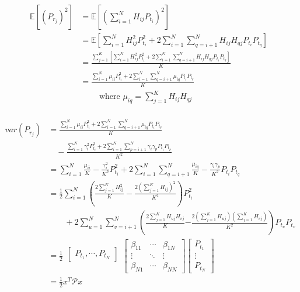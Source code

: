 \documentclass{beamer}
\providecommand{\sbrak}[1]{\ensuremath{{}\left[#1\right]}}
\providecommand{\brak}[1]{\ensuremath{\left(#1\right)}}
\providecommand{\lbrak}[1]{\ensuremath{\left(#1\right.}}
\providecommand{\rbrak}[1]{\ensuremath{\left.#1\right)}}
\theoremstyle{remark}
\begin{document}
\begin{frame}
\footnotesize{
\begin{align}
\mathbb{E}\sbrak{\brak{P_{r_j}}^2}&=\mathbb{E}\sbrak{\brak{\sum_{i=1}^NH_{ij}P_{t_i}}^2}\\ \nonumber
&=\mathbb{E}\sbrak{\sum_{i=1}^N H_{ij}^2P_{t_i}^2 + 2 \sum_{i=1}^N \sum_{q=i+1}^{N} H_{ij}H_{qj}P_{t_i}P_{t_q}}\\ \nonumber
&=\frac{\sum_{j=1}^K\sbrak{\sum_{i=1}^N H_{ij}^2P_{t_i}^2 + 2 \sum_{i=1}^N \sum_{q=i+1}^{N} H_{ij}H_{qj}P_{t_i}P_{t_q}}}{K}\\ \nonumber
&=\frac{\sum_{i=1}^N \mu_{ii} P_{t_i}^2 + 2 \sum_{i=1}^N \sum_{q=i+1}^{N} \mu_{iq} P_{t_i}P_{t_q}}{K}\\
&\qquad \text{ where } \mu_{iq}=\sum_{j=1}^KH_{ij}H_{qj}\\ \nonumber
\end{align}
}
\end{frame}
\begin{frame}
\footnotesize{
\begin{align}
var(P_{r_j})&=\frac{\sum_{i=1}^N \mu_{ii} P_{t_i}^2 + 2 \sum_{i=1}^N \sum_{q=i+1}^{N} \mu_{iq} P_{t_i}P_{t_q}}{K} \nonumber \\
             & \quad- \frac{\sum_{i=1}^N\gamma_i^2P_{t_i}^2+2\sum_{i=1}^N\sum_{p=i+1}^{N}\gamma_i\gamma_pP_{t_i}P_{t_p}}{K^2}  \nonumber \\
            &=\sum_{i=1}^N \frac{\mu_{ii}}{K}-\frac{\gamma_i^2}{K^2} P_{t_i}^2 + 2 \sum_{i=1}^N \sum_{q=i+1}^{N} \frac{\mu_{iq}}{K}-\frac{\gamma_i\gamma_p}{K^2} P_{t_i}P_{t_q} \nonumber \\
            &=\frac{1}{2}\sum_{i=1}^N \brak{\frac{2\sum_{j=1}^KH_{ij}^2}{K}-\frac{2\brak{\sum_{j=1}^KH_{ij}}^2}{K^2}} P_{t_i}^2 \nonumber \\
            &\qquad + 2 \sum_{u=1}^N \sum_{v=i+1}^{N} \lbrak{\frac{2\sum_{j=1}^KH_{uj}H_{vj}}{K} } \rbrak{-\frac{2\brak{\sum_{j=1}^KH_{uj}}\brak{\sum_{j=1}^KH_{vj}}}{K^2}} P_{t_u}P_{t_v} \nonumber \\
            &=\frac{1}{2}\begin{matrix}\begin{bmatrix}P_{t_1},\cdots,P_{t_N}\end{bmatrix}\\\mbox{}\end{matrix}
				\begin{bmatrix} \beta_{11}& \cdots &\beta_{1N} \\
								\vdots &\ddots &\vdots  \\
								\beta_{N1}& \cdots &\beta_{NN}  
								\end{bmatrix} 
				\begin{bmatrix} P_{t_1} \\ \vdots \\ P_{t_N} \end{bmatrix} \nonumber \\
			&=\frac{1}{2}x^T\mathcal{P}x
\end{align}
}
\end{frame}
\end{document}
